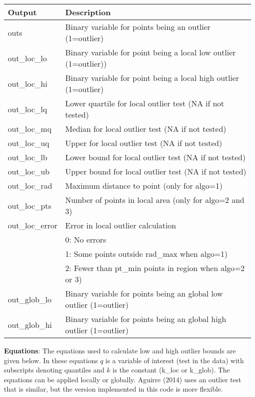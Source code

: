 \documentclass[12pt,a4paper]{article}
\begin{document}
\begin{table}[H]
\begin{tabular} {p{2cm} p{11cm}}
\hline
\textbf{Output} & \textbf{Description}\\
\hline
\textsf{outs}	 & Binary variable for points being an outlier (1=outlier)\\
\hline
\textsf{out\_loc\_lo} & Binary variable for point being a local low outlier (1=outlier)) \\
\textsf{out\_loc\_hi} & Binary variable for point being a local high outlier (1=outlier) \\
\textsf{out\_loc\_lq} & Lower quartile for local outlier test (NA if not tested) \\
\textsf{out\_loc\_mq} & Median for local outlier test (NA if not tested) \\
\textsf{out\_loc\_uq} & Upper for local outlier test (NA if not tested) \\
\textsf{out\_loc\_lb} & Lower bound for local outlier test (NA if not tested)\\
\textsf{out\_loc\_ub} & Upper bound for local outlier test (NA if not tested)\\
\textsf{out\_loc\_rad} & Maximum distance to point (only for algo=1)\\
\textsf{out\_loc\_pts} & Number of points in local area (only for algo=2 and 3)\\
\textsf{out\_loc\_error} & Error in local outlier calculation\\
 & 0: No errors\\
 & 1: Some points outside \textsf{rad\_max} when \textsf{algo}=1)\\
 & 2: Fewer than \textsf{pt\_min} points in region when \textsf{algo}=2 or 3)\\
\hline
\textsf{out\_glob\_lo} &  Binary variable for points being an global low outlier (1=outlier)\\
\textsf{out\_glob\_hi} &  Binary variable for points being an global high outlier (1=outlier)\\
\hline
\end{tabular} 
\end{table}

\textbf{Equations}: The equations used to calculate low and high outlier bounds are given below. In these equations $q$ is a variable of interest (\textsf{test} in the data) with subscripts denoting quantiles and $k$ is the constant (\textsf{k\_loc} or \textsf{k\_glob}). The equations can be applied locally or globally. Aguirre (2014) uses an outlier test that is similar, but the version implemented in this code is more flexible.
\end{document}
